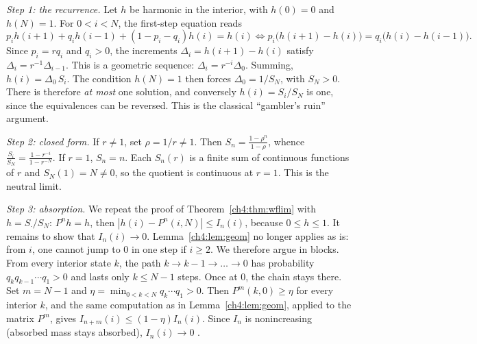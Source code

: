\begin{humanproof}
\emph{Step 1: the recurrence.} Let $h$ be harmonic in the interior, with $h(0)=0$ and $h(N)=1$. For $0<i<N$,
the first-step equation reads
\[
p_ih(i+1)+q_ih(i-1)+(1-p_i-q_i)h(i)=h(i)\iff p_i\bigl(h(i+1)-h(i)\bigr)=q_i\bigl(h(i)-h(i-1)\bigr).
\]
Since $p_i=rq_i$ and $q_i>0$, the increments $\Delta_i=h(i+1)-h(i)$ satisfy $\Delta_i=r^{-1}\Delta_{i-1}$.
This is a geometric sequence: $\Delta_i=r^{-i}\Delta_0$. Summing, $h(i)=\Delta_0\,S_i$. The condition $h(N)=1$
then forces $\Delta_0=1/S_N$, with $S_N>0$. There is therefore \emph{at most} one solution, and conversely
$h(i)=S_i/S_N$ is one, since the equivalences can be reversed. This is the classical ``gambler's
ruin'' argument.

\emph{Step 2: closed form.} If $r\ne1$, set $\rho=1/r\ne1$. Then $S_n=\frac{1-\rho^n}{1-\rho}$, whence
$\frac{S_i}{S_N}=\frac{1-r^{-i}}{1-r^{-N}}$. If $r=1$, $S_n=n$. Each $S_n(r)$ is a finite sum of continuous
functions of $r$ and $S_N(1)=N\ne0$, so the quotient is continuous at $r=1$. This is the neutral limit.

\emph{Step 3: absorption.} We repeat the proof of Theorem~\ref{ch4:thm:wflim} with $h=S_\cdot/S_N$:
$P^nh=h$, then $|h(i)-P^n(i,N)|\le I_n(i)$, because $0\le h\le1$. It remains to show that $I_n(i)\to0$.
Lemma~\ref{ch4:lem:geom} no longer applies as is: from $i$, one cannot jump to $0$ in one step if
$i\ge2$. We therefore argue in blocks. From every interior state $k$, the path $k\to k-1\to\dots\to0$ has
probability $q_kq_{k-1}\cdots q_1>0$ and lasts only $k\le N-1$ steps. Once at $0$, the chain stays there. Set
$m=N-1$ and $\eta=\min_{0<k<N}q_k\cdots q_1>0$. Then $P^m(k,0)\ge\eta$ for every interior $k$, and the same
computation as in Lemma~\ref{ch4:lem:geom}, applied to the matrix $P^m$, gives $I_{n+m}(i)\le(1-\eta)I_n(i)$.
Since $I_n$ is nonincreasing (absorbed mass stays absorbed), $I_n(i)\to0$ \tierC.
\end{humanproof}


